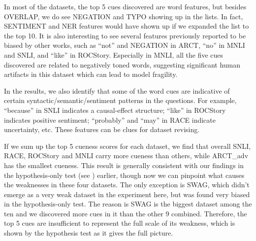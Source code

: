 In most of the datasets, the top 5 cues discovered are word features,
but besides OVERLAP, we do see NEGATION and TYPO showing up
in the lists. In fact, SENTIMENT and NER features would have shown up
if we expanded the list to the top 10. It is also interesting to see several features previously
reported to be biased by other works, such as ``not'' and NEGATION in
ARCT, ``no'' in MNLI and SNLI, and ``like'' in ROCStory.  Especially in
MNLI, all the five cues discovered are related to negatively toned words,
suggesting significant human artifacts in this dataset which can lead to model fragility.
 
In the results, we also identify that some of the word cues are indicative of
certain syntactic/semantic/sentiment patterns in the questions. For example, ``because'' in SNLI
indicates a causal-effect structure; ``like'' in ROCStory indicates positive sentiment;
``probably'' and ``may'' in RACE indicate uncertainty, etc. These features can be clues for 
dataset revising.

If we sum up the top 5 cueness scores for each dataset, we find that
overall SNLI, RACE, ROCStory and MNLI carry more cueness than others,
while ARCT\_adv has the smallest cueness. This result is
generally consistent with our findings in the hypothesis-only test (see )
earlier,
though now we can pinpoint what causes the weaknesses in these four
datasets. The only exception is SWAG, which didn't emerge as a very
weak dataset in the experiment here, but was found very biased in
the hypothesis-only test. The reason is SWAG is the biggest dataset
among the ten and we discovered more cues in it than
the other 9 combined. Therefore, the top 5 cues are insufficient
to represent the full scale of its weakness, which is shown by
the hypothesis test as it gives the full picture.

